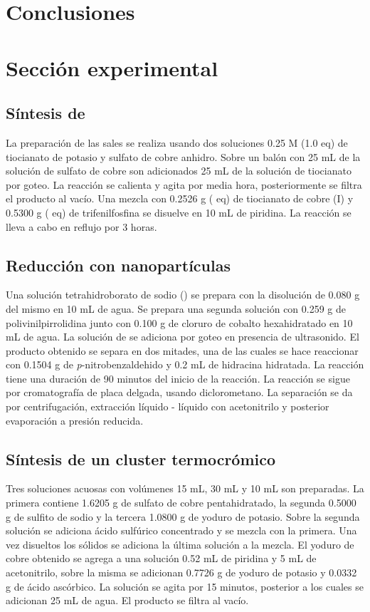 \documentclass[fleqn,10pt]{SelfArx}
\begin{document}
\section{Conclusiones}

\section{Secci\'on experimental}
\subsection{S\'intesis de }
La preparaci\'on de las sales se realiza usando dos soluciones 0.25 M (1.0 eq) de tiocianato de potasio y sulfato de cobre anhidro. Sobre un bal\'on con 25 mL de la soluci\'on de sulfato de cobre son adicionados 25 mL de la soluci\'on de tiocianato por goteo. La reacci\'on se calienta y agita por media hora, posteriormente se filtra el producto al vac\'io. Una mezcla con 0.2526 g ( eq) de tiocianato de cobre (I) y 0.5300 g ( eq) de trifenilfosfina se disuelve en 10 mL de piridina. La reacci\'on se lleva a cabo en reflujo por 3 horas.

\subsection{Reducci\'on con nanopart\'iculas}
Una soluci\'on tetrahidroborato de sodio () se prepara con la disoluci\'on de 0.080 g del mismo en 10 mL de agua. Se prepara una segunda soluci\'on con 0.259 g de polivinilpirrolidina junto con 0.100 g de cloruro de cobalto hexahidratado en 10 mL de agua. La soluci\'on de  se adiciona por goteo en presencia de ultrasonido. El producto obtenido se separa en dos mitades, una de las cuales se hace reaccionar con 0.1504 g de \textit{p}-nitrobenzaldehido y 0.2 mL de hidracina hidratada. La reacci\'on tiene una duraci\'on de 90 minutos del inicio de la reacci\'on. La reacci\'on se sigue por cromatograf\'ia de placa delgada, usando diclorometano. La separaci\'on se da por centrifugaci\'on, extracci\'on l\'iquido - l\'iquido con acetonitrilo y posterior evaporaci\'on a presi\'on reducida.

\subsection{S\'intesis de un cluster termocr\'omico}
Tres soluciones acuosas con vol\'umenes 15 mL, 30 mL y 10 mL son preparadas. La primera contiene 1.6205 g de sulfato de cobre pentahidratado, la segunda 0.5000 g de sulfito de sodio y la tercera 1.0800 g de yoduro de potasio. Sobre la segunda soluci\'on se adiciona \'acido sulf\'urico concentrado y se mezcla con la primera. Una vez disueltos los s\'olidos se adiciona la \'ultima soluci\'on a la mezcla. El yoduro de cobre obtenido se agrega a una soluci\'on 0.52 mL de piridina y 5 mL de acetonitrilo, sobre la misma se adicionan 0.7726 g de yoduro de potasio y 0.0332 g de \'acido asc\'orbico. La soluci\'on se agita por 15 minutos, posterior a los cuales se adicionan 25 mL de agua. El producto se filtra al vac\'io.  
\end{document}

